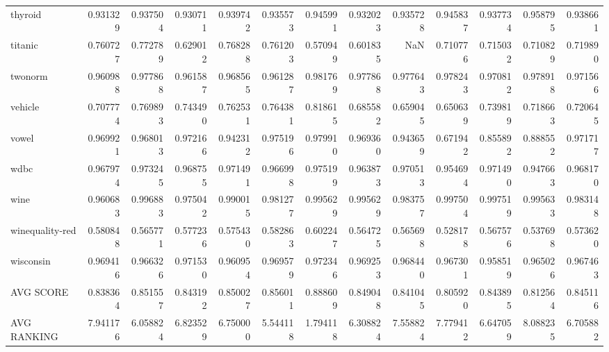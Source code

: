 \begin{tabular}{lrrrrrrrrrrrr}
thyroid         &   0.931329 &  0.937504 &  0.930711 &  0.939742 &  0.935573 &  0.945991 &  0.932023 &  0.935728 &  0.945837 &  0.937734 &  0.958795 &  0.938661 \\
titanic         &   0.760727 &  0.772789 &  0.629012 &  0.768288 &  0.761203 &  0.570949 &  0.601835 &       NaN &  0.710776 &  0.715032 &  0.710829 &  0.719890 \\
twonorm         &   0.960988 &  0.977868 &  0.961587 &  0.968565 &  0.961287 &  0.981769 &  0.977868 &  0.977643 &  0.978243 &  0.970812 &  0.978918 &  0.971566 \\
vehicle         &   0.707774 &  0.769893 &  0.743490 &  0.762531 &  0.764381 &  0.818615 &  0.685582 &  0.659045 &  0.650639 &  0.739819 &  0.718663 &  0.720645 \\
vowel           &   0.969921 &  0.968013 &  0.972166 &  0.942312 &  0.975196 &  0.979910 &  0.969360 &  0.943659 &  0.671942 &  0.855892 &  0.888552 &  0.971717 \\
wdbc            &   0.967974 &  0.973245 &  0.968755 &  0.971491 &  0.966998 &  0.975199 &  0.963873 &  0.970513 &  0.954694 &  0.971490 &  0.947663 &  0.968170 \\
wine            &   0.960683 &  0.996883 &  0.975042 &  0.990015 &  0.981277 &  0.995629 &  0.995629 &  0.983757 &  0.997504 &  0.997519 &  0.995633 &  0.983148 \\
winequality-red &   0.580848 &  0.565771 &  0.577236 &  0.575430 &  0.582863 &  0.602247 &  0.564725 &  0.565698 &  0.528178 &  0.567576 &  0.537698 &  0.573620 \\
wisconsin       &   0.969416 &  0.966326 &  0.971530 &  0.960954 &  0.969579 &  0.972346 &  0.969253 &  0.968440 &  0.967301 &  0.958519 &  0.965026 &  0.967463 \\
AVG SCORE       &   0.838364 &  0.851557 &  0.843192 &  0.850027 &  0.856011 &  0.888609 &  0.849048 &  0.841045 &  0.805920 &  0.843895 &  0.812564 &  0.845116 \\
AVG RANKING     &   7.941176 &  6.058824 &  6.823529 &  6.750000 &  5.544118 &  1.794118 &  6.308824 &  7.558824 &  7.779412 &  6.647059 &  8.088235 &  6.705882 \\
\bottomrule
\end{tabular}
